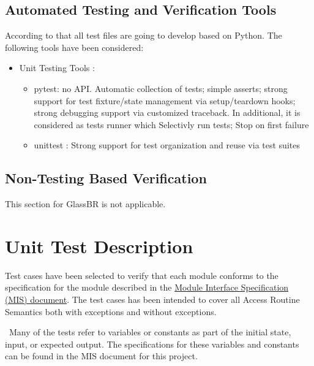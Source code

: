 \documentclass[12pt]{article}
\newcommand{\progname}{GlassBR}
\begin{document}
\subsection{Automated Testing and Verification Tools}
According to that all test files are going to develop based on Python. The following tools have been considered:
\begin{itemize}
	\item Unit Testing Tools :
	\begin{itemize}
		\item pytest:  no API. Automatic collection of tests; simple asserts; strong support for test fixture/state management via setup/teardown hooks; strong debugging support via customized traceback. In additional, it is considered as tests runner which Selectivly run tests; Stop on first failure 
		\item unittest : Strong support for test organization and reuse via test suites 
		 \end{itemize}
	 \end{itemize}


\subsection{Non-Testing Based Verification}
This section for \progname{} is not applicable.  

\section{Unit Test Description}

\noindent Test cases have been selected to verify that each module conforms to 
the specification for the module described in the 
\href{https://github.com/smiths/caseStudies/blob/master/CaseStudies/glass/docs/Design/MIS/glassbr_mis.pdf}
{Module Interface Specification (MIS) document}. The test cases has been
intended to cover all Access Routine Semantics  both with exceptions and without exceptions. 

~\newline \noindent Many of the tests refer to variables or constants as part 
of the initial state, input, or expected output. The specifications for these 
variables and constants can be found in the MIS document for this project.
\end{document}
